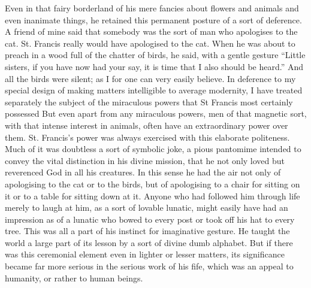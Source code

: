 \documentclass{book}
\begin{document}
Even in that fairy borderland of his mere fancies about flowers and animals and even inanimate things, he retained this permanent posture of a sort of deference. A friend of mine said that somebody was the sort of man who apologises to the cat. St. Francis really would have apologised to the cat. When he was about to preach in a wood full of the chatter of birds, he said, with a gentle gesture “Little sisters, if you have now had your say, it is time that I also should be heard.” And all the birds were silent; as I for one can very easily believe. In deference to my special design of making matters intelligible to average modernity, I have treated separately the subject of the miraculous powers that St Francis most certainly possessed But even apart from any miraculous powers, men of that magnetic sort, with that intense interest in animals, often have an extraordinary power over them. St. Francis’s power was always exercised with this elaborate politeness. Much of it was doubtless a sort of symbolic joke, a pious pantomime intended to convey the vital distinction in his divine mission, that he not only loved but reverenced God in all his creatures. In this sense he had the air not only of apologising to the cat or to the birds, but of apologising to a chair for sitting on it or to a table for sitting down at it. Anyone who had followed him through life merely to laugh at him, as a sort of lovable lunatic, might easily have had an impression as of a lunatic who bowed to every post or took off his hat to every tree. This was all a part of his instinct for imaginative gesture. He taught the world a large part of its lesson by a sort of divine dumb alphabet. But if there was this ceremonial element even in lighter or lesser matters, its significance became far more serious in the serious work of his fife, which was an appeal to humanity, or rather to human beings.
\end{document}

